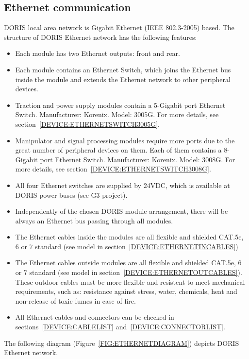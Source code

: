\subsection{Ethernet communication}
DORIS local area network is Gigabit Ethernet (IEEE 802.3-2005) based. The structure of DORIS Ethernet network has the following features:
\begin{itemize}
  \item Each module has two Ethernet outputs: front and rear.
  \item Each module contains an Ethernet Switch, which joins the Ethernet bus inside the module and extends the Ethernet network to other peripheral devices.
  \item Traction and power supply modules contain a 5-Gigabit port Ethernet Switch. Manufacturer: Korenix. Model: 3005G. For more details, see section~\ref{DEVICE:ETHERNETSWITCH3005G}.
  \item Manipulator and signal processing modules require more ports due to the great number of peripheral devices on them. Each of them contains a 8-Gigabit port Ethernet Switch. Manufacturer: Korenix. Model: 3008G. For more details, see section~\ref{DEVICE:ETHERNETSWITCH3008G}.
  \item All four Ethernet switches are supplied by 24VDC, which is available at DORIS power buses (see G3 project).
  \item Independently of the chosen DORIS module arrangement, there will be always an Ethernet bus passing through all modules.
  \item The Ethernet cables inside the modules are all flexible and shielded CAT.5e, 6 or 7 standard (see model in section~\ref{DEVICE:ETHERNETINCABLES})
  \item The Ethernet cables outside modules are all flexible and shielded CAT.5e, 6 or 7 standard (see model in section~\ref{DEVICE:ETHERNETOUTCABLES}). These outdoor cables must be more flexible and resistent to meet mechanical requirements, such as: resistance against stress, water, chemicals, heat and non-release of toxic fumes in case of fire.
  \item All Ethernet cables and connectors can be checked in sections~\ref{DEVICE:CABLELIST} and~\ref{DEVICE:CONNECTORLIST}.
\end{itemize}
The following diagram (Figure~\ref{FIG:ETHERNETDIAGRAM}) depicts DORIS Ethernet network.
